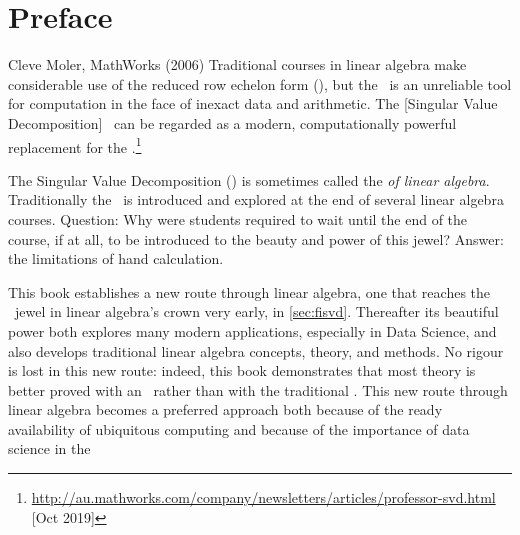 \begin{comment}
To lead students to further consideration of such points, and to avoid replicating material  that is laid down well elsewhere, I have included a further reading section at the end of  each chapter. These lists of readings aim to be directive rather than exhaustive, and I hope  that any student who is interested in mathematics will read widely from such material and  thus benefit from the insights offered by a variety of experts. My sincere thanks to Keith  Mansfield and Clare Charles at Oxford University Press, to the reviewers of the original  book proposal, and to the following colleagues, friends, and students who were kind  enough to give detailed and thoughtful feedback on earlier versions of this work: Nina
X X X X
\end{comment}



\tableofcontents


\chapter*{Preface}


\begin{quoted}{Cleve Moler, MathWorks (2006)}
Traditional courses in linear algebra make considerable use of the 
{reduced row echelon form} (\rref), but the \rref\ is an unreliable tool for computation in the face of inexact data and arithmetic. 
The [Singular Value Decomposition] \svd\ can be regarded as a modern, computationally powerful replacement for the \rref.\footnote{\url{http://au.mathworks.com/company/newsletters/articles/professor-svd.html} [Oct 2019]}
\end{quoted}

The Singular Value Decomposition (\svd) is sometimes called the \emph{ of linear algebra}.
Traditionally the \svd\ is introduced and explored at the end of several linear algebra courses.
Question: Why were students required to wait until the end of the course, if at all, to be introduced to the beauty and power of this jewel?
Answer: the limitations of hand calculation.

This book establishes a new route through linear algebra, one that reaches the \svd\ jewel in linear algebra's crown very early, in \cref{sec:fisvd}.
Thereafter its beautiful power both explores many modern applications, especially in Data Science, and also develops traditional linear algebra concepts, theory, and methods.
No rigour is lost in this new route: indeed, this book demonstrates that most theory is better proved with an \svd\ rather than with the traditional \rref.
This new route through linear algebra becomes a preferred approach both because of the ready availability of ubiquitous computing and because of the importance of data science in the 


